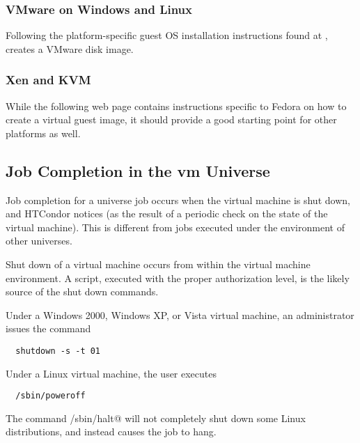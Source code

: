 \subsubsection{\label{sec:vm-disk-image-details-vmware}
VMware on Windows and Linux}

Following the platform-specific
guest OS installation instructions found at
,
creates a VMware disk image.

\subsubsection{\label{sec:vm-disk-image-details-xen}Xen and KVM}
While the following web page contains instructions specific to
Fedora on how to create a virtual guest image,
it should provide a good starting point for 
other platforms as well.


\subsection{\label{sec:vm-job-completion-details}Job Completion in the vm Universe}

Job completion for a  universe job occurs when 
the virtual machine is shut down, and HTCondor notices 
(as the result of a periodic check on the state of the virtual machine).
This is different from jobs executed under the environment of other 
universes.

Shut down of a virtual machine occurs from within the virtual
machine environment.
A script, executed with the proper authorization level,
is the likely source of the shut down commands.

Under a Windows 2000, Windows XP, or Vista virtual machine,
an administrator issues the command
\begin{verbatim}
  shutdown -s -t 01
\end{verbatim}

Under a Linux virtual machine,
the  user executes
\begin{verbatim}
  /sbin/poweroff
\end{verbatim}
The command \verb@/sbin/halt@ will not completely
shut down some Linux distributions, and instead
causes the job to hang.

